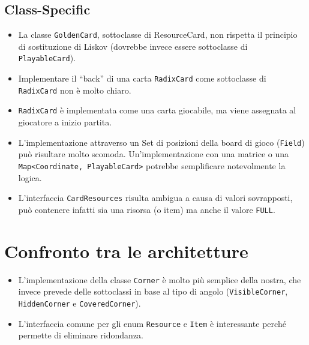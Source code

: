 \documentclass{article}
\begin{document}
\subsection{Class-Specific}

\begin{itemize}
  \item La classe \texttt{GoldenCard}, sottoclasse di ResourceCard, non rispetta il principio di sostituzione di Liskov (dovrebbe invece essere sottoclasse di \\\texttt{PlayableCard}).
  \item Implementare il ``back'' di una carta \texttt{RadixCard} come sottoclasse di \texttt{RadixCard} non è molto chiaro.
  \item \texttt{RadixCard} è implementata come una carta giocabile, ma viene assegnata al giocatore a inizio partita.
  \item L'implementazione attraverso un Set di posizioni della board di gioco (\texttt{Field}) può risultare molto scomoda. Un'implementazione con una matrice o una \texttt{Map<Coordinate, PlayableCard>} potrebbe semplificare notevolmente la logica.
  \item L'interfaccia \texttt{CardResources} risulta ambigua a causa di valori sovrapposti, può contenere infatti sia una risorsa (o item) ma anche il valore \texttt{FULL}.
\end{itemize}

\section{Confronto tra le
  architetture}

\begin{itemize}
  \item L'implementazione della classe \texttt{Corner} è molto più semplice della nostra, che invece prevede delle sottoclassi in base al tipo di angolo (\texttt{VisibleCorner}, \texttt{HiddenCorner} e \texttt{CoveredCorner}).
  \item L'interfaccia comune per gli enum \texttt{Resource} e \texttt{Item} è interessante perché permette di eliminare ridondanza.
\end{itemize}
\end{document}
